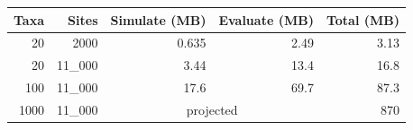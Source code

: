 \begin{tabular}{rrrrr}
  \toprule
  Taxa & Sites & Simulate (MB) & Evaluate (MB) & Total (MB) \\
  \midrule
  20 & 2000 & 0.635 & 2.49 & 3.13 \\
  20 & 11\_000 & 3.44 & 13.4 & 16.8 \\
  100 & 11\_000 & 17.6 & 69.7 & 87.3 \\
  \midrule
  1000 & 11\_000 & \multicolumn{2}{c}{projected} & 870 \\
  \bottomrule
\end{tabular}
